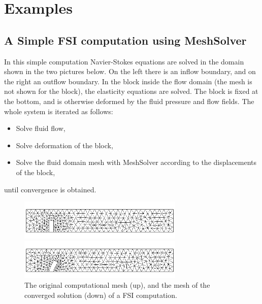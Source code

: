 \section{Examples}

\subsection{A Simple FSI computation using MeshSolver}

In this simple computation Navier-Stokes equations are solved in the
domain shown in the two pictures below. On the left there is an inflow
boundary, and on the right an outflow boundary. In the block inside
the flow domain (the mesh is not shown for the block), the elasticity
equations are solved. The block is fixed at the bottom, and is otherwise
deformed by the fluid pressure and flow fields. The whole system is
iterated as follows:
\begin{itemize}
\item Solve fluid flow,
\item Solve deformation of the block,
\item Solve the fluid domain mesh with MeshSolver  according to the displacements
   of the block,
\end{itemize}
until convergence is obtained.

\begin{figure}[tbhp]
  \centerline{\includegraphics[width=0.7\textwidth]{orig.png}}
  \centerline{\includegraphics[width=0.7\textwidth]{deform.png}}
  \caption{The original computational mesh (up), and the mesh of the converged solution (down) of a FSI
    computation.}
\end{figure}

%
%

